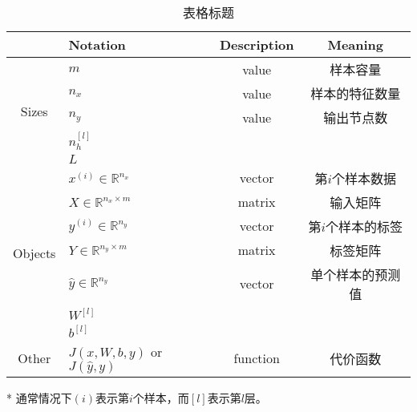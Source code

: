 	\begin{table}[h]
		\centering
		\begin{threeparttable}
		\caption{表格标题}
		\begin{tabular}{clcc}
			\hline
									 & \textbf{Notation}                   & \textbf{Description} & Meaning    \\ \hline
			\multirow{5}{*}{Sizes}   & $m$                                 & value                & 样本容量       \\
									 & $n_x$                               & value                & 样本的特征数量    \\
									 & $n_y$                               & value                & 输出节点数      \\
									 & $n_h^{[l]}$                         &                      &            \\
									 & $L$                                 &                      &            \\ \hline
			\multirow{7}{*}{Objects} & $x^{(i)} \in \mathbb{R}^{n_x}$      & vector               & 第$i$个样本数据  \\
									 & $X \in {\mathbb{R}^{n_x \times m}}$ & matrix               & 输入矩阵       \\
									 & $y^{(i)} \in \mathbb{R}^{n_y}$      & vector               & 第$i$个样本的标签 \\
									 & $Y \in {\mathbb{R}^{n_y \times m}}$ & matrix               & 标签矩阵       \\
									 & $\hat{y} \in \mathbb{R}^{n_y}$      & vector               & 单个样本的预测值   \\
									 & $W^{[l]}$                           &                      &            \\
									 & $b^{[l]}$                           &                      &            \\ \hline
			Other                    & $J(x,W,b,y)$ or $J(\hat{y},y)$      & function             & 代价函数       \\ \hline
		\end{tabular}
		\label{tab:notations} %
    	\begin{tablenotes}
      		\item[*] 通常情况下$(i)$表示第$i$个样本，而$[l]$表示第$l$层。
    	\end{tablenotes}
		\end{threeparttable}
	\end{table}

